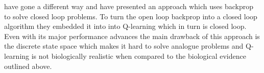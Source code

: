 \documentclass{article}
\begin{document}
\cite{Guo2014} have gone a different way and have presented an
approach which uses backprop to solve closed loop problems. To turn the
open loop backprop into a closed loop algorithm they embedded it into
into Q-learning which in turn is closed loop. Even with its major
performance advances the main drawback of this approach is the
discrete state space which makes it hard to solve analogue problems
and Q-learning is not biologically realistic when compared to the
biological evidence outlined above.




\end{document}
